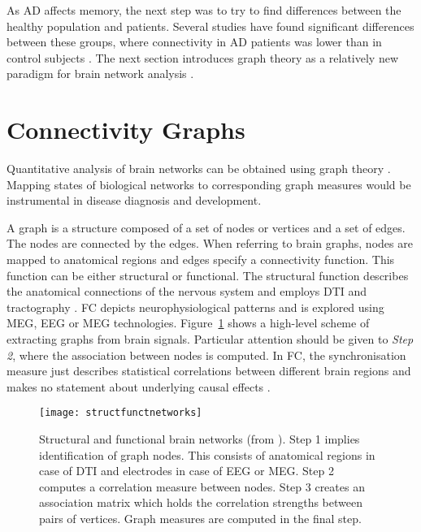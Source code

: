 	As \ac{AD} affects memory, the next step was to try to find differences between the healthy population and patients. Several studies have found significant differences between these groups, where connectivity in \ac{AD} patients was lower than in control subjects \autocite{Stam2006,Greicius2004,Sheline2010}. The next section introduces graph theory as a relatively new paradigm for brain network analysis \autocite{Stam2012}.

	\section{Connectivity Graphs}
	Quantitative analysis of brain networks can be obtained using graph theory \autocite{sporns2011networks}. Mapping states of biological networks to corresponding graph measures would be instrumental in disease diagnosis and development.

	A graph is a structure composed of a set of nodes or vertices and a set of edges. The nodes are connected by the edges. When referring to brain graphs, nodes are mapped to anatomical regions and edges specify a connectivity function. This function can be either structural or functional. The structural function describes the anatomical connections of the nervous system and employs \ac{DTI} and tractography \autocite{Jones2011}. \ac{FC} depicts neurophysiological patterns and is explored using \ac{MEG}, \ac{EEG} or \ac{MEG} technologies. Figure~\ref{fig:structfunctnetworks} shows a high-level scheme of extracting graphs from brain signals. Particular attention should be given to \textit{Step 2}, where the association between nodes is computed. In \ac{FC}, the synchronisation measure just describes statistical correlations between different brain regions and makes no statement about underlying causal effects \autocite{sporns2011networks}. 

	\begin{figure}
		    \centering
		    \texttt{[image: structfunctnetworks]}
		    \caption{Structural and functional brain networks (from \textcite{Bullmore2009}). Step 1 implies identification of graph nodes. This consists of anatomical regions in case of \ac{DTI} and electrodes in case of \ac{EEG} or \ac{MEG}. Step 2 computes a correlation measure between nodes. Step 3 creates an association matrix which holds the correlation strengths between pairs of vertices. Graph measures are computed in the final step.}
		    \label{fig:structfunctnetworks}
	\end{figure}   

